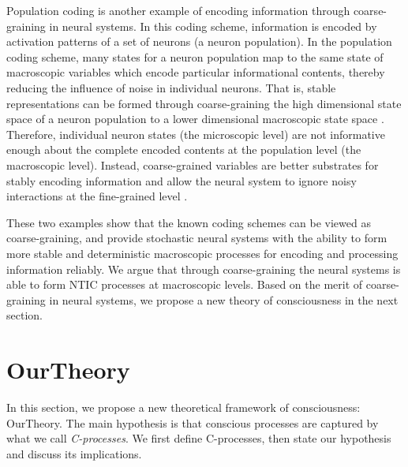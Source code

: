 \documentclass[utf8]{article}
\begin{document}
		Population coding is another example of encoding information through coarse-graining in neural systems. In this coding scheme, information is encoded by activation patterns of a set of neurons (a neuron population). In the population coding scheme, many states for a neuron population map to the same state of macroscopic variables which encode particular informational contents, thereby reducing the influence of noise in individual neurons. That is, stable representations can be formed through coarse-graining the high dimensional state space of a neuron population to a lower dimensional macroscopic state space \citep{kristan1997population, pouget2000information, binder2009encyclopedia, QuianQuiroga2009}. Therefore, individual neuron states (the microscopic level) are not informative enough about the complete encoded contents at the population level (the macroscopic level). Instead, coarse-grained variables are better substrates for stably encoding information and allow the neural system to ignore noisy interactions at the fine-grained level \citep{Woodward2007-WOOCWA}.
		
        These two examples show that the known coding schemes can be viewed as coarse-graining, and provide stochastic neural systems with the ability to form more stable and deterministic macroscopic processes for encoding and processing information reliably. We argue that through coarse-graining the neural systems is able to form NTIC processes at macroscopic levels. Based on the merit of coarse-graining in neural systems, we propose a new theory of consciousness in the next section. 



	\section{\acf{OurTheory}}\label{sec:OurTheory}
	
        In this section, we propose a new theoretical framework of consciousness: \acf{OurTheory}. The main hypothesis is that conscious processes are captured by what we call \textit{C-processes}. We first define C-processes, then state our hypothesis and discuss its implications.
        
\end{document}

